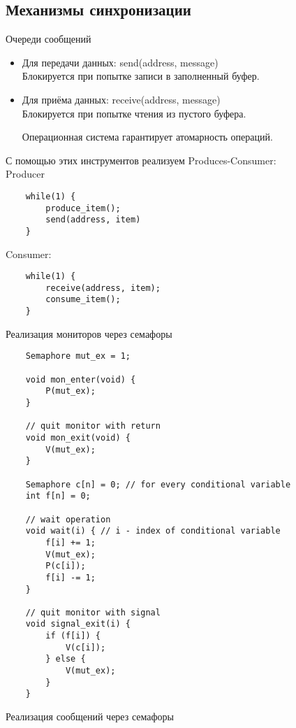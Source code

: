 \documentclass[12pt, a4paper]{article}
\begin{document}
    \subsection*{Механизмы синхронизации}
    \begin{center}
        Очереди сообщений
    \end{center}
    \begin{itemize}
        \item Для передачи данных: send(address, message)\\
        Блокируется при попытке записи в заполненный буфер.
        \item Для приёма данных: receive(address, message)\\
        Блокируется при попытке чтения из пустого буфера.\par
        Операционная система гарантирует атомарность операций.
    \end{itemize}
    С помощью этих инструментов реализуем Produces-Consumer:\\
    Producer
    \begin{lstlisting}
    while(1) {
        produce_item();
        send(address, item)
    }
    \end{lstlisting}
    Consumer:
    \begin{lstlisting}
    while(1) {
        receive(address, item);
        consume_item();
    }
    \end{lstlisting}
    \newpage
    \begin{center}
        Реализация мониторов через семафоры
    \end{center}
    \begin{lstlisting}
    Semaphore mut_ex = 1;

    void mon_enter(void) {
        P(mut_ex);
    }

    // quit monitor with return
    void mon_exit(void) {
        V(mut_ex);
    }

    Semaphore c[n] = 0; // for every conditional variable
    int f[n] = 0;

    // wait operation
    void wait(i) { // i - index of conditional variable
        f[i] += 1;
        V(mut_ex);
        P(c[i]);
        f[i] -= 1;
    }

    // quit monitor with signal
    void signal_exit(i) {
        if (f[i]) {
            V(c[i]);
        } else {
            V(mut_ex);
        }
    }
    \end{lstlisting}
    \newpage
    \begin{center}
        Реализация сообщений через семафоры
    \end{center}
\end{document}
